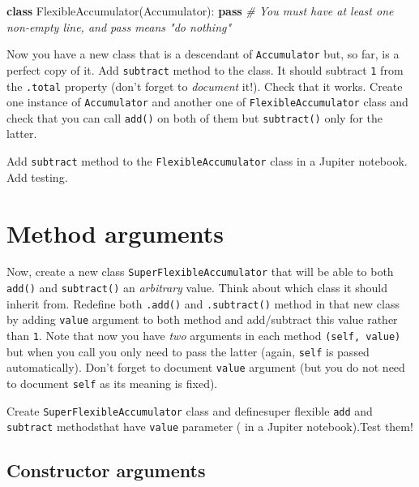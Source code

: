 \documentclass[
]{book}
\newenvironment{Shaded}{\begin{snugshade}}{\end{snugshade}}
\newcommand{\CommentTok}[1]{\textcolor[rgb]{0.56,0.35,0.01}{\textit{#1}}}
\newcommand{\ControlFlowTok}[1]{\textcolor[rgb]{0.13,0.29,0.53}{\textbf{#1}}}
\newcommand{\KeywordTok}[1]{\textcolor[rgb]{0.13,0.29,0.53}{\textbf{#1}}}
\newcommand{\NormalTok}[1]{#1}
\begin{document}
\begin{Shaded}
\begin{Highlighting}[]
\KeywordTok{class}\NormalTok{ FlexibleAccumulator(Accumulator):}
    \ControlFlowTok{pass} \CommentTok{\# You must have at least one non{-}empty line, and pass means "do nothing"}
\end{Highlighting}
\end{Shaded}

Now you have a new class that is a descendant of \texttt{Accumulator} but, so far, is a perfect copy of it. Add \texttt{subtract} method to the class. It should subtract \texttt{1} from the \texttt{.total} property (don't forget to \emph{document} it!). Check that it works. Create one instance of \texttt{Accumulator} and another one of \texttt{FlexibleAccumulator} class and check that you can call \texttt{add()} on both of them but \texttt{subtract()} only for the latter.

Add \texttt{subtract} method to the \texttt{FlexibleAccumulator}
class in a Jupiter notebook. Add testing.

\hypertarget{method-arguments}{%
\section{Method arguments}\label{method-arguments}}

Now, create a new class \texttt{SuperFlexibleAccumulator} that will be able to both \texttt{add()} and \texttt{subtract()} an \emph{arbitrary} value. Think about which class it should inherit from. Redefine both \texttt{.add()} and \texttt{.subtract()} method in that new class by adding \texttt{value} argument to both method and add/subtract this value rather than \texttt{1}. Note that now you have \emph{two} arguments in each method \texttt{(self,\ value)} but when you call you only need to pass the latter (again, \texttt{self} is passed automatically). Don't forget to document \texttt{value} argument (but you do not need to document \texttt{self} as its meaning is fixed).

Create \texttt{SuperFlexibleAccumulator} class and definesuper flexible \texttt{add} and \texttt{subtract} methodsthat have \texttt{value} parameter ( in a Jupiter notebook).Test them!

\hypertarget{constructor-arguments}{%
\subsection{Constructor arguments}\label{constructor-arguments}}
\end{document}

